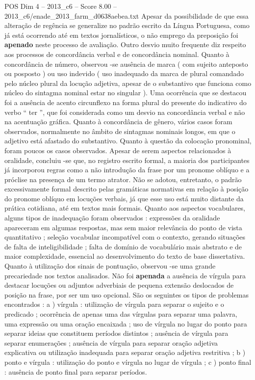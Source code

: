 \begin{textsample}{POS Dim 4 – 2013\_c6 – Score 8.00 – 2013\_c6/enade\_2013\_farm\_d0638aebea.txt}
Apesar da possibilidade de que essa alteração de regência se generalize no padrão escrito da Língua Portuguesa, como já está ocorrendo até em textos jornalísticos, o não emprego da preposição foi \textbf{apenado} neste processo de avaliação.
Outro desvio muito frequente diz respeito aos processos de concordância verbal e de concordância nominal.
Quanto à concordância de número, observou -se ausência de marca ( com sujeito anteposto ou posposto ) ou uso indevido ( uso inadequado da marca de plural comandado pelo núcleo plural da locução adjetiva, apesar de o substantivo que funciona como núcleo do sintagma nominal estar no singular ).
Uma ocorrência que se destacou foi a ausência de acento circunflexo na forma plural do presente do indicativo do verbo “ ter ”, que foi considerada como um desvio na concordância verbal e não na acentuação gráfica.
Quanto à concordância de gênero, vários casos foram observados, normalmente no âmbito de sintagmas nominais longos, em que o adjetivo está afastado do substantivo.
Quanto à questão da colocação pronominal, foram poucos os casos observados.
Apesar de serem aspectos relacionados à oralidade, concluiu -se que, no registro escrito formal, a maioria dos participantes já incorporou regras como a não introdução da frase por um pronome oblíquo e a próclise na presença de um termo atrator.
Não se adotou, entretanto, o padrão excessivamente formal descrito pelas gramáticas normativas em relação à posição do pronome oblíquo em locuções verbais, já que esse uso está muito distante da prática cotidiana, até em textos mais formais.
Quanto aos aspectos vocabulares, alguns tipos de inadequação foram observados : expressões da oralidade apareceram em algumas respostas, mas sem maior relevância do ponto de vista quantitativo ; seleção vocabular incompatível com o contexto, gerando situações de falta de inteligibilidade ; falta de domínio de vocabulário mais abstrato e de maior complexidade, essencial ao desenvolvimento do texto de base dissertativa.
Quanto à utilização dos sinais de pontuação, observou -se uma grande precariedade nos textos analisados.
Não foi \textbf{apenada} a ausência de vírgula para destacar locuções ou adjuntos adverbiais de pequena extensão deslocados de posição na frase, por ser um uso opcional.
São os seguintes os tipos de problemas encontrados : a ) vírgula : utilização de vírgula para separar o sujeito e o predicado ; ocorrência de apenas uma das vírgulas para separar uma palavra, uma expressão ou uma oração encaixada ; uso de vírgula no lugar do ponto para separar ideias que constituem períodos distintos ; ausência de vírgula para separar enumerações ; ausência de vírgula para separar oração adjetiva explicativa ou utilização inadequada para separar oração adjetiva restritiva ; b ) ponto e vírgula : utilização do ponto e vírgula no lugar de vírgula ; c ) ponto final : ausência de ponto final para separar períodos.

\end{textsample}
